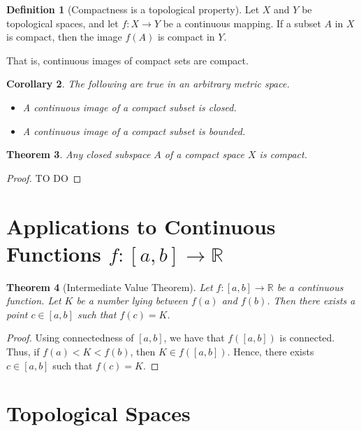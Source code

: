 \documentclass[10pt, oneside, reqno]{amsart}
\theoremstyle{plain}%
\newtheorem{thm}{Theorem}[section]
\newtheorem{cor}[thm]{Corollary}
\theoremstyle{definition}
\newtheorem{defn}[thm]{Definition}
\theoremstyle{remark}
\newcommand{\R}{\mathbb{R}}
\begin{document}
\begin{defn}[Compactness is a topological property]
    Let $X$ and $Y$ be topological spaces, and let $f : X \rightarrow Y$ be a continuous mapping.  If a subset $A$ in $X$ is compact, then the image $f(A)$ is compact in $Y$.
    
    That is, continuous images of compact sets are compact.
\end{defn}

\begin{cor}
    The following are true in an arbitrary metric space.
    \begin{itemize}
        \item A continuous image of a compact subset is closed.
        \item A continuous image of a compact subset is bounded.
    \end{itemize}
\end{cor}

\begin{thm}
    Any closed subspace $A$ of a compact space $X$ is compact.
\end{thm}

\begin{proof}
    TO DO
\end{proof}


\section{Applications to Continuous Functions $f : [a,b] \rightarrow \R$} %
\label{sec:applications_to_f_a_b_rightarrow_r_}
\begin{thm}[Intermediate Value Theorem]
    Let $f: [a,b] \rightarrow \R$ be a continuous function.  Let $K$ be a number lying between $f(a)$ and $f(b)$.  Then there exists a point $c \in [a,b]$ such that $f(c) = K$.
\end{thm}

\begin{proof}
    Using connectedness of $[a,b]$, we have that $f([a,b])$ is connected.  Thus, if $f(a) < K < f(b)$, then $K \in f([a,b])$.  Hence, there exists $c \in [a,b]$ such that $f(c) = K$.
\end{proof}


\section{Topological Spaces} %
\label{sec:topological_spaces}
\end{document}
